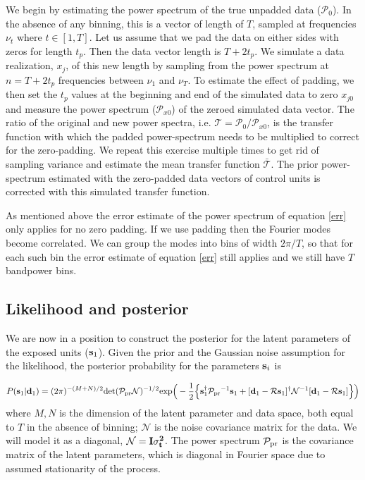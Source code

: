\documentclass{article}
\def\bs{{\bf s}}
\def\bd{{\bf d}}
\def\pprior{\mathcal{P_{\rm pr}}}
\newcommand\CM[1]{\textcolor{blue}{(CM: #1)}}
\begin{document}
We begin by estimating the power spectrum of the true unpadded data ($\mathcal{P}_0$). In the absence of any binning, this is a vector of length of $T$, sampled at frequencies $\nu_t$ where $t \in [1, T]$. Let us assume that we pad the data on either sides with zeros for length $t_p$. Then the data vector length is $T+2t_p$. We simulate a data realization, $x_j$, of this new length by sampling 
from the power spectrum at $n=T+2t_p$ frequencies between $\nu_1$ and $\nu_T$.
To estimate the effect of padding, we then set the $t_p$ values at the beginning and end of the simulated data to zero $x_{j0}$ and measure the power spectrum ($\mathcal{P}_{x0}$) of the zeroed simulated data vector. The ratio of the original and new power spectra, i.e. $\mathcal{T} = \mathcal{P_0}/\mathcal{P}_{x0}$, is the transfer function with which the padded power-spectrum needs to be multiplied to correct for the zero-padding. We repeat this exercise multiple times to get rid of sampling variance and estimate the mean transfer function $\bar{\mathcal{T}}$. The prior power-spectrum estimated with the zero-padded data vectors of control units is corrected with this simulated transfer function. 

As mentioned above the error estimate of the power spectrum of equation \ref{err} only applies for no zero padding. 
If we use padding then the Fourier modes become correlated. We can group the modes into bins of width $2\pi/T$, so that for each such bin the error estimate of equation \ref{err} still 
applies and we still have $T$ bandpower bins. 

\subsection{Likelihood and posterior}
\label{sec:likelihood}
We are now in a position to construct the posterior for the latent parameters of the exposed units ($\bs_1$). Given the prior and the Gaussian noise assumption for the likelihood, the posterior probability for the parameters $\bs_i$ is

\begin{equation}
    P(\bs_1|\bd_1) = (2\pi)^{-(M+N)/2} {\rm det} (\pprior \mathcal{N})^{-1/2}{\rm exp} \Big(-\frac{1}{2} \Big\{\bs_1^\dagger \pprior^{-1}\bs_1 + [\bd_1 - \mathcal{R}\bs_1]^\dagger \mathcal{N}^{-1}[\bd_1 - \mathcal{R} \bs_1] \Big\}\Big)
    \label{eq:posterior1}
\end{equation}
where  $M, N$ is the dimension of the latent parameter and data space, both equal to $T$ in the absence of binning; $\mathcal{N}$ is the noise covariance matrix for the data. We will model it 
as a diagonal, $\mathcal{N}=\bf{I}\sigma_t^2$. 
The power spectrum $\pprior$ is the covariance matrix 
of the latent parameters, which is diagonal in Fourier space due to assumed stationarity of the 
process. 
\end{document}
